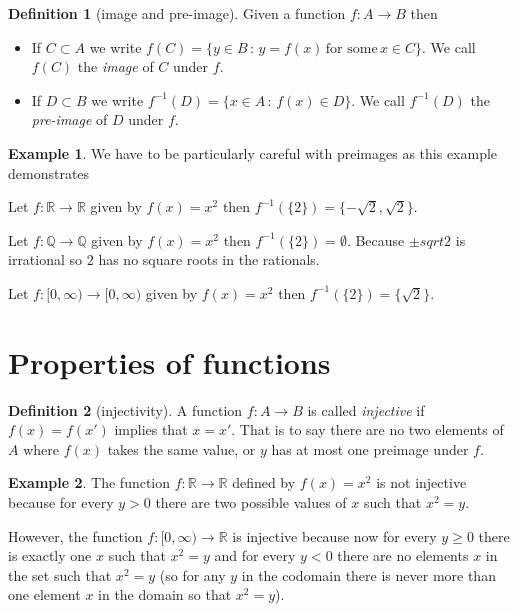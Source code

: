\documentclass[
]{book}
\theoremstyle{definition}
\newtheorem{definition}{Definition}[chapter]
\theoremstyle{definition}
\newtheorem{example}{Example}[chapter]
\theoremstyle{definition}
\theoremstyle{definition}
\theoremstyle{remark}
\begin{document}
\begin{definition}[image and pre-image]

Given a function \(f:A \rightarrow B\) then

\begin{itemize}
\item
  If \(C \subset A\) we write \(f(C) = \{y \in B \,:\, y = f(x) \, \mbox{for some} \, x \in C\}\). We call \(f(C)\) the \emph{image} of \(C\) under \(f\).
\item
  If \(D \subset B\) we write \(f^{-1}(D) = \{ x \in A \,:\, f(x) \in D\}\). We call \(f^{-1}(D)\) the \emph{pre-image} of \(D\) under \(f\).
\end{itemize}

\end{definition}

\begin{example}
We have to be particularly careful with preimages as this example demonstrates

Let \(f: \mathbb{R} \rightarrow \mathbb{R}\) given by \(f(x) = x^2\) then \(f^{-1}(\{2\}) = \{-\sqrt{2}, \sqrt{2}\}\).

Let \(f: \mathbb{Q} \rightarrow \mathbb{Q}\) given by \(f(x) = x^2\) then \(f^{-1}(\{2\})= \emptyset\). Because \(\pm sqrt{2}\) is irrational so \(2\) has no square roots in the rationals.

Let \(f: [0, \infty) \rightarrow [0, \infty)\) given by \(f(x)=x^2\) then \(f^{-1}(\{2\}) = \{\sqrt{2}\}\).
\end{example}

\section{Properties of functions}\label{properties-of-functions}

\begin{definition}[injectivity]
A function \(f:A\rightarrow B\) is called \emph{injective} if \(f(x)=f(x')\) implies that \(x=x'\). That is to say there are no two elements of \(A\) where \(f(x)\) takes the same value, or \(y\) has at most one preimage under \(f\).
\end{definition}

\begin{example}
The function \(f: \mathbb{R} \rightarrow \mathbb{R}\) defined by \(f(x) =x^2\) is not injective because for every \(y>0\) there are two possible values of \(x\) such that \(x^2 = y\).

However, the function \(f: [0, \infty) \rightarrow \mathbb{R}\) is injective because now for every \(y\geq 0\) there is exactly one \(x\) such that \(x^2=y\) and for every \(y <0\) there are no elements \(x\) in the set such that \(x^2 = y\) (so for any \(y\) in the codomain there is never more than one element \(x\) in the domain so that \(x^2 = y\)).
\end{example}
\end{document}
